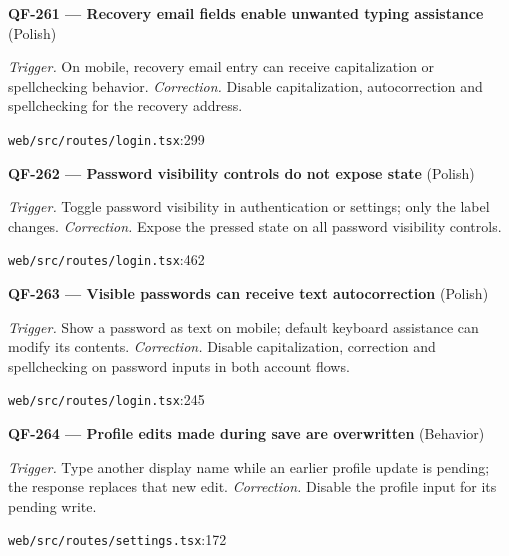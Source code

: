 \begin{minipage}{\linewidth}
\textbf{QF-261 --- Recovery email fields enable unwanted typing assistance} {\scriptsize\color{accent}(Polish)}\par
\textit{Trigger.} On mobile, recovery email entry can receive capitalization or spellchecking behavior. \textit{Correction.} Disable capitalization, autocorrection and spellchecking for the recovery address.\par
{\scriptsize\color{muted}\nolinkurl{web/src/routes/login.tsx}:299}\par
\end{minipage}\par\vspace{7pt}
\begin{minipage}{\linewidth}
\textbf{QF-262 --- Password visibility controls do not expose state} {\scriptsize\color{accent}(Polish)}\par
\textit{Trigger.} Toggle password visibility in authentication or settings; only the label changes. \textit{Correction.} Expose the pressed state on all password visibility controls.\par
{\scriptsize\color{muted}\nolinkurl{web/src/routes/login.tsx}:462}\par
\end{minipage}\par\vspace{7pt}
\begin{minipage}{\linewidth}
\textbf{QF-263 --- Visible passwords can receive text autocorrection} {\scriptsize\color{accent}(Polish)}\par
\textit{Trigger.} Show a password as text on mobile; default keyboard assistance can modify its contents. \textit{Correction.} Disable capitalization, correction and spellchecking on password inputs in both account flows.\par
{\scriptsize\color{muted}\nolinkurl{web/src/routes/login.tsx}:245}\par
\end{minipage}\par\vspace{7pt}
\begin{minipage}{\linewidth}
\textbf{QF-264 --- Profile edits made during save are overwritten} {\scriptsize\color{accent}(Behavior)}\par
\textit{Trigger.} Type another display name while an earlier profile update is pending; the response replaces that new edit. \textit{Correction.} Disable the profile input for its pending write.\par
{\scriptsize\color{muted}\nolinkurl{web/src/routes/settings.tsx}:172}\par
\end{minipage}\par\vspace{7pt}

